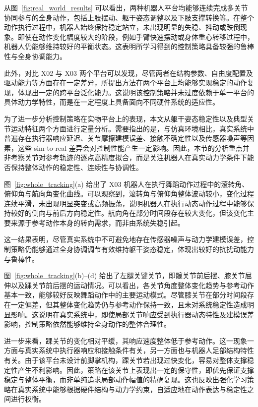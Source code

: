 从图~\ref{fig:real_world_results} 可以看出，两种机器人平台均能够连续完成多关节协同参与的全身动作，包括上肢摆动、躯干姿态调整以及下肢支撑转换等。在整个动作执行过程中，机器人始终保持稳定站立，未出现明显的失稳、抖动或跌倒现象。即使在动作变化幅度较大的阶段，例如手臂快速摆动或身体重心转移过程中，机器人仍能够维持较好的平衡状态。这表明所学习得到的控制策略具备较强的鲁棒性与全身协调能力。

此外，对比 X02 与 X03 两个平台可以发现，尽管两者在结构参数、自由度配置及驱动能力等方面存在一定差异，所提出方法在两个平台上均能够实现稳定的动作复现，体现出一定的跨平台泛化能力。这说明该控制策略并未过度依赖于单一平台的具体动力学特性，而是在一定程度上具备面向不同硬件系统的适应性。

为了进一步分析控制策略在实物平台上的表现，本文从躯干姿态稳定性以及典型关节运动特征两个方面进行定量分析。需要指出的是，与仿真环境相比，真实系统中普遍存在执行器响应延迟、关节摩擦建模误差、接触不确定性以及传感器噪声等因素，这些 sim-to-real 差异会对控制性能产生一定影响。因此，本节的分析重点并非考察关节对参考轨迹的逐点高精度拟合，而是关注机器人在真实动力学条件下能否保持整体动作的稳定性、连续性与协调性。

图~\ref{fig:whole_tracking}(a) 给出了 X03 机器人在执行舞蹈动作过程中的滚转角、俯仰角与航向角变化曲线。可以观察到，滚转角与俯仰角整体波动较小，变化过程连续平滑，未出现明显突变或高频振荡，说明机器人在执行动态动作过程中能够保持较好的侧向与前后方向稳定性。航向角在部分时间段存在较大变化，但该变化主要来源于参考动作本身的转向需求，而非由系统失稳引起。

这一结果表明，尽管真实系统中不可避免地存在传感器噪声与动力学建模误差，控制策略仍能够通过全身协调调节有效维持躯干姿态稳定，体现出较好的抗扰动能力与鲁棒性。

图~\ref{fig:whole_tracking}(b)--(d) 给出了左腿关键关节，即髋关节前后摆、膝关节屈伸以及踝关节前后摆的运动情况。可以看出，各关节角度整体变化趋势与参考动作基本一致，能够较好反映舞蹈动作中的主要运动模式。尽管膝关节在部分时间段存在一定偏差，但其整体变化趋势仍与参考动作保持一致，且未对系统稳定性造成明显影响。这说明在真实系统中，即使局部关节响应受到执行器动态特性及建模误差影响，控制策略依然能够维持全身动作的整体合理性。

进一步来看，踝关节的变化相对平缓，其响应速度整体低于参考动作。这一现象一方面与真实系统中执行器响应和接触条件有关，另一方面也与机器人足部结构特性有关。由于该平台未设计前脚掌机构，踝关节若出现过快变化，容易对整体支撑稳定性产生不利影响。因此，策略在该关节上表现出一定的保守性，即优先保证支撑稳定与整体平衡，而非单纯追求局部动作幅值的精确复现。这也反映出强化学习策略在真实系统中能够根据硬件结构与动力学约束，自适应地在动作表达与稳定性之间进行权衡。

